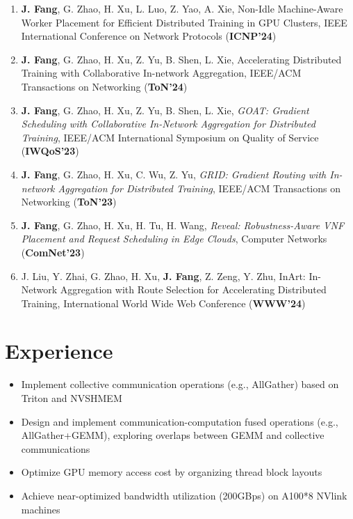\documentclass{resume}
\begin{document}
\begin{enumerate}
  \item \textbf{J. Fang}, G. Zhao, H. Xu, L. Luo, Z. Yao, A. Xie, Non-Idle Machine-Aware Worker Placement for Efficient Distributed Training in GPU Clusters, IEEE International Conference on Network Protocols (\textbf{ICNP'24})
  \item \textbf{J. Fang}, G. Zhao, H. Xu, Z. Yu, B. Shen, L. Xie, Accelerating Distributed Training with Collaborative
  In-network Aggregation, IEEE/ACM Transactions on Networking (\textbf{ToN'24})
  \item \textbf{J. Fang}, G. Zhao, H. Xu, Z. Yu, B. Shen, L. Xie, \textit{GOAT: Gradient Scheduling with Collaborative In-Network Aggregation for Distributed Training}, IEEE/ACM International Symposium on Quality of Service (\textbf{IWQoS'23})
  \item \textbf{J. Fang}, G. Zhao, H. Xu, C. Wu, Z. Yu, \textit{GRID: Gradient Routing with In-network Aggregation for Distributed Training}, IEEE/ACM Transactions on Networking (\textbf{ToN'23})
  \item \textbf{J. Fang}, G. Zhao, H. Xu, H. Tu, H. Wang, \textit{Reveal: Robustness-Aware VNF Placement and Request Scheduling in Edge Clouds}, Computer Networks (\textbf{ComNet'23})
  \item J. Liu, Y. Zhai, G. Zhao, H. Xu, \textbf{J. Fang}, Z. Zeng, Y. Zhu, InArt: In-Network Aggregation with Route
  Selection for Accelerating Distributed Training, International World Wide Web Conference (\textbf{WWW'24})
\end{enumerate}

\section{Experience}

\begin{itemize}
  \item Implement collective communication operations (e.g., AllGather) based on Triton and NVSHMEM
  \item Design and implement communication-computation fused operations (e.g., AllGather+GEMM), exploring overlaps between GEMM and collective communications
  \item Optimize GPU memory access cost by organizing thread block layouts
  \item Achieve near-optimized bandwidth utilization (200GBps) on A100*8 NVlink machines
\end{itemize}
\end{document}
